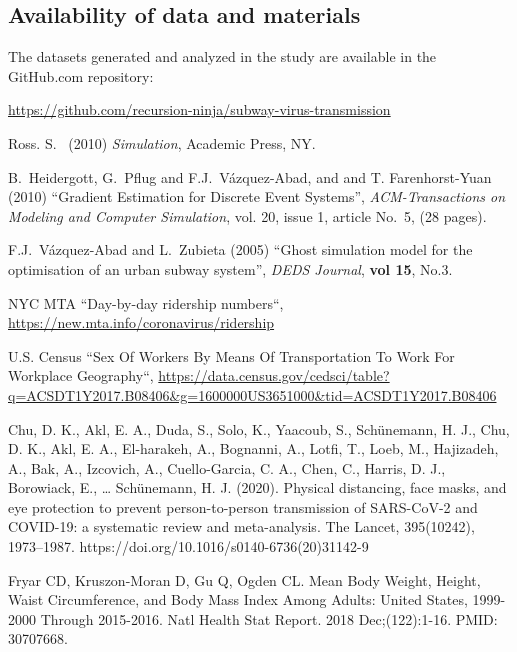 \documentclass[12pt]{article}
\begin{document}
\clearpage

\subsection*{Availability of data and materials}

The datasets generated and analyzed in the study are available in the GitHub.com repository:

\centerline{\url{https://github.com/recursion-ninja/subway-virus-transmission}}

\begin{thebibliography}{00}

 Ross. S.~ (2010) {\em Simulation}, Academic Press, NY.

  B.~Heidergott, G.~Pflug and F.J.~V\'azquez-Abad, and and T. Farenhorst-Yuan (2010) 
``Gradient Estimation for Discrete Event Systems'',  {\em ACM-Transactions on Modeling and Computer Simulation},  vol. 20, issue 1, article  No.~5,  (28 pages).

     F.J.~V\'azquez-Abad and L.~Zubieta (2005) ``Ghost simulation model for
the optimisation of an urban subway system'', {\em DEDS Journal}, {\bf vol 15}, No.3.

 NYC MTA ``Day-by-day ridership numbers``,  \url{https://new.mta.info/coronavirus/ridership}

 U.S. Census ``Sex Of Workers By Means Of Transportation To Work For Workplace Geography``, \url{https://data.census.gov/cedsci/table?q=ACSDT1Y2017.B08406&g=1600000US3651000&tid=ACSDT1Y2017.B08406}

 Chu, D. K., Akl, E. A., Duda, S., Solo, K., Yaacoub, S., Schünemann, H. J., Chu, D. K., Akl, E. A., El-harakeh, A., Bognanni, A., Lotfi, T., Loeb, M., Hajizadeh, A., Bak, A., Izcovich, A., Cuello-Garcia, C. A., Chen, C., Harris, D. J., Borowiack, E., … Schünemann, H. J. (2020). Physical distancing, face masks, and eye protection to prevent person-to-person transmission of SARS-CoV-2 and COVID-19: a systematic review and meta-analysis. The Lancet, 395(10242), 1973–1987. https://doi.org/10.1016/s0140-6736(20)31142-9

 Fryar CD, Kruszon-Moran D, Gu Q, Ogden CL. Mean Body Weight, Height, Waist Circumference, and Body Mass Index Among Adults: United States, 1999-2000 Through 2015-2016. Natl Health Stat Report. 2018 Dec;(122):1-16. PMID: 30707668.


\end{thebibliography}
\end{document}
